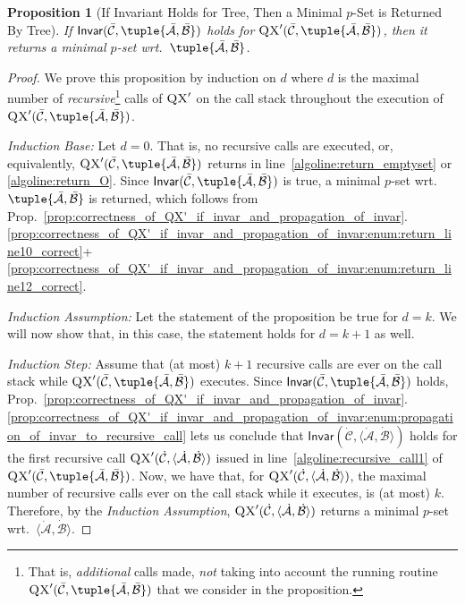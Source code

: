 \documentclass[]{elsarticle}
\newcommand{\scQX}{{\textsc{QX}}}
\newcommand{\ma}{\mathcal{A}}
\newcommand{\mb}{\mathcal{B}}
\newcommand{\mc}{\mathcal{C}}
\newcommand{\ba}{\bar{\ma}}
\newcommand{\bb}{\bar{\mb}}
\newcommand{\bc}{\bar{\mc}}
\newcommand{\Inv}{\mathsf{Invar}}
\newcommand{\dmb}{\dot{\mb}}
\newcommand{\dma}{\dot{\ma}}
\newcommand{\dmc}{\dot{\mc}}
\newtheorem{proposition}{Proposition}[]{}
\begin{document}
	\begin{proposition}[If Invariant Holds for Tree, Then a Minimal $p$-Set is Returned By Tree]\label{prop:if_invar_holds_for_tree_then_min_p-set_returned_by_tree}
		If $\Inv(\bc,\tuple{\ba,\bb})$ holds for $\scQX'(\bc,\tuple{\ba,\bb})$, then it returns a minimal $p$-set wrt.\ $\tuple{\ba,\bb}$.	
	\end{proposition}
	\begin{proof}
		We prove this proposition by induction on $d$ where $d$ is the maximal number of \emph{recursive}\footnote{That is, \emph{additional} calls made, \emph{not} taking into account the running routine $\scQX'(\bc,\tuple{\ba,\bb})$ that we consider in the proposition.} calls of $\scQX'$ on the call stack throughout the execution of $\scQX'(\bc,\tuple{\ba,\bb})$.\vspace{5pt}
		
		\noindent\emph{Induction Base:} Let $d=0$. That is, no recursive calls are executed, or, equivalently, $\scQX'(\bc,\tuple{\ba,\bb})$ returns in line~\ref{algoline:return_emptyset} or \ref{algoline:return_O}. Since $\Inv(\bc,\tuple{\ba,\bb})$ is true, a minimal $p$-set wrt.\ $\tuple{\ba,\bb}$ is returned, which follows from Prop.~\ref{prop:correctness_of_QX'_if_invar_and_propagation_of_invar}.\ref{prop:correctness_of_QX'_if_invar_and_propagation_of_invar:enum:return_line10_correct}+\ref{prop:correctness_of_QX'_if_invar_and_propagation_of_invar:enum:return_line12_correct}.\vspace{5pt}
		
		\noindent\emph{Induction Assumption:} Let the statement of the proposition be true for $d=k$. We will now show that, in this case, the statement holds for $d = k+1$ as well.\vspace{5pt}
		
		\noindent\emph{Induction Step:} 
		Assume that (at most) $k+1$ recursive calls are ever on the call stack while $\scQX'(\bc,\tuple{\ba,\bb})$ executes. Since $\Inv(\bc,\tuple{\ba,\bb})$ holds, Prop.~\ref{prop:correctness_of_QX'_if_invar_and_propagation_of_invar}.\ref{prop:correctness_of_QX'_if_invar_and_propagation_of_invar:enum:propagation_of_invar_to_recursive_call} lets us conclude that $\Inv(\dmc,\langle\dma,\dmb\rangle)$ holds for the first recursive call $\scQX'(\dmc,\langle\dma,\dmb\rangle)$ issued in line~\ref{algoline:recursive_call1} of $\scQX'(\bc,\tuple{\ba,\bb})$. Now, we have that, for $\scQX'(\dmc,\langle\dma,\dmb\rangle)$, the maximal number of recursive calls ever on the call stack while it executes, is (at most) $k$. Therefore, by the \emph{Induction Assumption}, $\scQX'(\dmc,\langle\dma,\dmb\rangle)$ returns a minimal $p$-set wrt.\ $\langle\dma,\dmb\rangle$. 
		

\end{proof}
\end{document}
